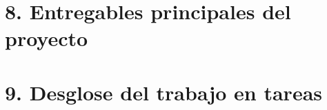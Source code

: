 \documentclass[
11pt, %
codirector, %
]{charter}
\begin{document}
\section{8. Entregables principales del proyecto}
\label{sec:entregables}

%
%
%

\section{9. Desglose del trabajo en tareas}
\label{sec:wbs}

%
%
%
%
\end{document}

